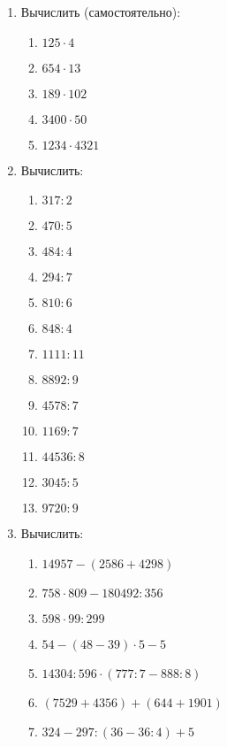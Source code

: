 \documentclass[12pt, a4paper]{article}
\begin{document}
	
 \cfoot{}
\begin{enumerate}
	\item Вычислить (самостоятельно):
	\begin{multicols}{5}
		\begin{enumerate}[label=\textbf{\arabic*)}]
			\item $125\cdot4$
			\item $654\cdot13$
			\item $189\cdot102$
			\item $3400\cdot50$
			\item $1234\cdot4321$
		\end{enumerate}
	\end{multicols}
	\item Вычислить:
	\begin{multicols}{5}
		\begin{enumerate}[label=\textbf{\arabic*)}]
			\item $317:2$
			\item $470:5$
			\item $484:4$
			\item $294:7$
			\item $810:6$
			\item $848:4$
			\item $1111:11$
			\item $8892:9$
			\item $4578:7$
			\item $1169:7$
			\item $44536:8$
			\item $3045:5$
			\item $9720:9$
		\end{enumerate}
	\end{multicols}
	\item Вычислить:
	\begin{multicols}{2}
		\begin{enumerate}[label=\textbf{\arabic*)}]
			\item \( 14957 - (2586+4298) \)
			\item \( 758\cdot809 - 180492:356 \)
			\item \( 598\cdot99:299 \)
			\item \( 54 - (48-39)\cdot5 - 5 \)
			\item \( 14 304:596\cdot(777:7-888:8) \)
			\item \( (7529+4356)+(644+1901) \)
			\item \( 324-297:(36-36:4)+5 \)
		\end{enumerate}

\end{multicols}
\end{enumerate}
\end{document}
